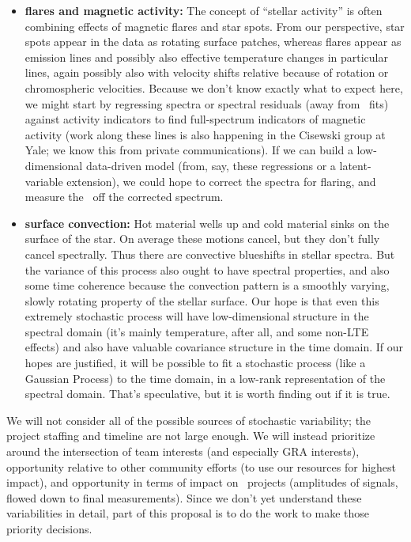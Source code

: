 \documentclass[12pt, letterpaper]{article}
\begin{document}
\begin{itemize}
\item
\textbf{flares and magnetic activity:}
The concept of ``stellar activity'' is often combining effects of
magnetic flares and star spots.
From our perspective, star spots appear in the data as rotating
surface patches, whereas flares appear as emission lines and possibly
also effective temperature changes in particular lines, again possibly
also with velocity shifts relative because of rotation or
chromospheric velocities.
Because we don't know exactly what to expect here, we might start by
regressing spectra or spectral residuals (away from \wobble\ fits)
against activity indicators to find full-spectrum indicators of
magnetic activity (work along these lines is also happening in the
Cisewski group at Yale; we know this from private communications).
If we can build a low-dimensional data-driven model (from, say, these
regressions or a latent-variable extension), we could hope to correct
the spectra for flaring, and measure the \RV\ off the corrected
spectrum.
\item
\textbf{surface convection:}
Hot material wells up and cold material sinks on the surface of the star.
On average these motions cancel, but they don't fully cancel spectrally.
Thus there are convective blueshifts in stellar spectra.
But the variance of this process also ought to have spectral
properties, and also some time coherence because the convection
pattern is a smoothly varying, slowly rotating property of the stellar
surface.
Our hope is that even this extremely stochastic process will have
low-dimensional structure in the spectral domain (it's mainly
temperature, after all, and some non-LTE effects) and also have
valuable covariance structure in the time domain.
If our hopes are justified, it will be possible to fit a stochastic
process (like a Gaussian Process) to the time domain, in a low-rank
representation of the spectral domain.
That's speculative, but it is worth finding out if it is true.
\end{itemize}

\noindent
We will not consider all of the possible sources of stochastic variability;
the project staffing and timeline are not large enough.
We will instead prioritize around the intersection of team interests (and
especially GRA interests), opportunity relative to other community efforts
(to use our resources for highest impact), and opportunity in terms of
impact on \EPRV\ projects (amplitudes of signals, flowed down to final measurements).
Since we don't yet understand these variabilities in detail, part of this
proposal is to do the work to make those priority decisions.
\end{document}
